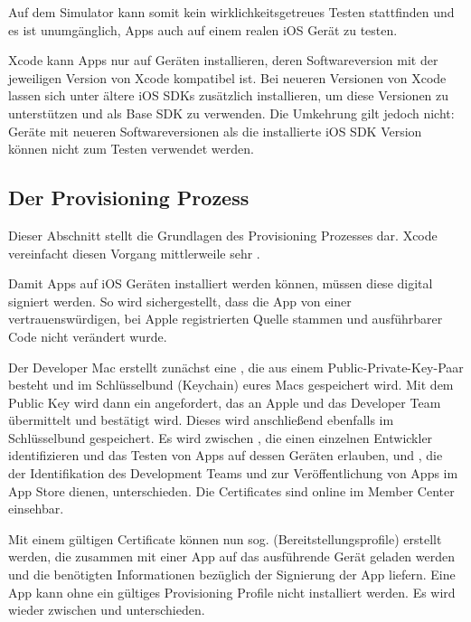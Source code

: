 \documentclass[parskip=half, final]{scrreprt}
\begin{document}

Auf dem Simulator kann somit kein wirklichkeitsgetreues Testen stattfinden und es ist unumgänglich, Apps auch auf einem realen iOS Gerät zu testen.

Xcode kann Apps nur auf Geräten installieren, deren Softwareversion mit der jeweiligen Version von Xcode kompatibel ist. Bei neueren Versionen von Xcode lassen sich unter  ältere iOS SDKs zusätzlich installieren, um diese Versionen zu unterstützen und als Base SDK  zu verwenden. Die Umkehrung gilt jedoch nicht: Geräte mit neueren Softwareversionen als die installierte iOS SDK Version können nicht zum Testen verwendet werden.


\subsection{Der Provisioning Prozess}\label{sec:provisioning}

 Dieser Abschnitt stellt die Grundlagen des Provisioning Prozesses dar. Xcode vereinfacht diesen Vorgang mittlerweile sehr .

Damit Apps auf iOS Geräten installiert werden können, müssen diese digital signiert werden. So wird sichergestellt, dass die App von einer vertrauenswürdigen, bei Apple registrierten Quelle stammen und ausführbarer Code nicht verändert wurde.

Der Developer Mac erstellt zunächst eine , die aus einem Public-Private-Key-Paar besteht und im Schlüsselbund (Keychain) eures Macs gespeichert wird. Mit dem Public Key wird dann ein  angefordert, das an Apple und das Developer Team übermittelt und bestätigt wird. Dieses wird anschließend ebenfalls im Schlüsselbund gespeichert. Es wird zwischen , die einen einzelnen Entwickler identifizieren und das Testen von Apps auf dessen Geräten erlauben, und , die der Identifikation des Development Teams und zur Veröffentlichung von Apps im App Store dienen, unterschieden. Die Certificates sind online im Member Center  einsehbar.

Mit einem gültigen Certificate können nun sog.  (Bereitstellungsprofile) erstellt werden, die zusammen mit einer App auf das ausführende Gerät geladen werden und die benötigten Informationen bezüglich der Signierung der App liefern. Eine App kann ohne ein gültiges Provisioning Profile nicht installiert werden. Es wird wieder zwischen  und  unterschieden.
\end{document}

